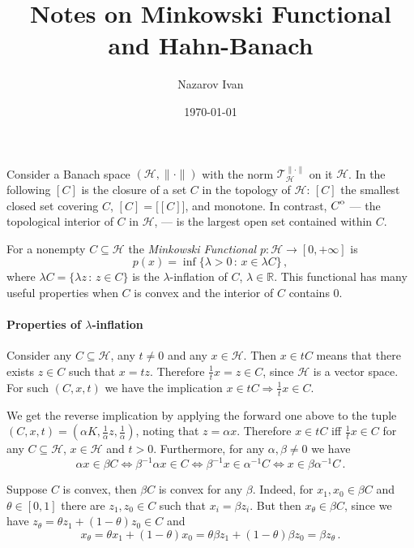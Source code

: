 \documentclass[a4paper]{article}
\title{Notes on Minkowski Functional and Hahn-Banach}
\author{Nazarov Ivan}
\date{\today}
\newcommand{\Hcal}{\mathcal{H}}
\newcommand{\real}{\mathbb{R}}
\newcommand{\interior}[1]{%
  {\kern0pt#1}^{\mathrm{o}}%
}
\newcommand{\Tcal}{\mathcal{T}}
\begin{document}
\maketitle

Consider a Banach space $(\Hcal, \|\cdot\|)$ with the norm $\Tcal^{\|\cdot\|}_\Hcal$
on it $\Hcal$. In the following $[C]$ is the closure of a set $C$ in the topology
of $\Hcal$: $[C]$ the smallest closed set covering $C$, $[C] = \bigl[[C]\bigr]$,
and monotone. In contrast, $\interior{C}$ --- the topological interior of $C$ in
$\Hcal$, --- is the largest open set contained within $C$.

For a nonempty $C \subseteq \Hcal$ the {\it Minkowski Functional} $p\colon \Hcal
\to [0, +\infty]$ is
\begin{equation*}
  p(x)
    = \inf \bigl\{ \lambda > 0\,:\, x \in \lambda C\bigr\}
    \,,
\end{equation*}
where $\lambda C = \{\lambda z \,:\, z\in C\}$ is the $\lambda$-inflation of $C$,
$\lambda \in\real$. This functional has many useful properties when $C$ is convex
and the interior of $C$ contains $0$.

\paragraph{Properties of $\lambda$-inflation} %
\label{par:properties_of_lambda_inflation}

Consider any $C\subseteq \Hcal$, any $t \neq 0$ and any $x\in \Hcal$. Then $x\in t C$
means that there exists $z \in C$ such that $x = t z$. Therefore $\tfrac1t x = z
\in C$, since $\Hcal$ is a vector space. For such $(C, x, t)$ we have the implication
$x \in t C \Rightarrow \tfrac1t x \in C$.

We get the reverse implication by applying the forward one above to the tuple $(C, x, t)
= (\alpha K, \tfrac1\alpha z, \tfrac1\alpha)$, noting that $z = \alpha x$. Therefore
$x\in t C$ iff $\tfrac1t x \in C$ for any $C\subseteq \Hcal$, $x\in \Hcal$ and $t > 0$.
Furthermore, for any $\alpha, \beta \neq 0$ we have
\begin{equation*}
  \alpha x \in \beta C \Leftrightarrow
  \beta^{-1} \alpha x \in C \Leftrightarrow
  \beta^{-1} x \in \alpha^{-1} C \Leftrightarrow
  x \in \beta \alpha^{-1} C
  \,.
\end{equation*}

Suppose $C$ is convex, then $\beta C$ is convex for any $\beta$. Indeed, for $x_1,
x_0 \in \beta C$ and $\theta\in [0, 1]$ there are $z_1, z_0 \in C$ such that $x_i
= \beta z_i$. But then $x_\theta \in \beta C$, since we have $z_\theta = \theta z_1
+ (1-\theta) z_0 \in C$ and
\begin{equation*}
  x_\theta
  = \theta x_1 + (1-\theta) x_0
  = \theta \beta z_1 + (1-\theta) \beta z_0
  = \beta z_\theta
  \,.
\end{equation*}
\end{document}
